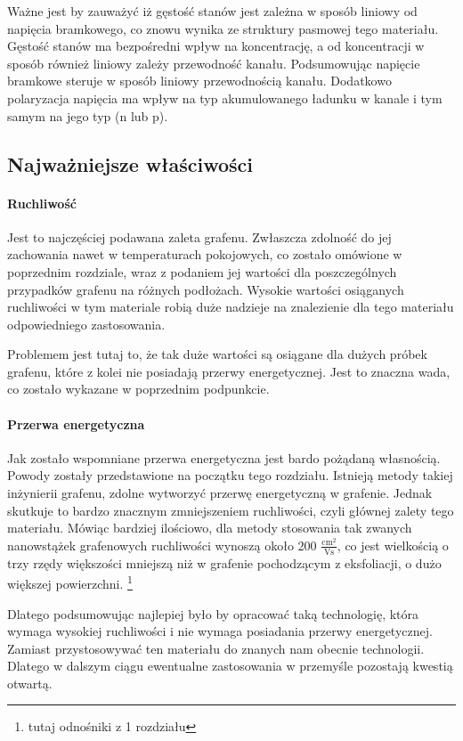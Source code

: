 	Ważne jest by zauważyć iż gęstość stanów jest zależna w sposób liniowy od napięcia bramkowego, co znowu wynika
	ze struktury pasmowej tego materiału. Gęstość stanów ma bezpośredni wpływ na koncentrację, a od koncentracji
	w sposób również liniowy zależy przewodność kanału. Podsumowując napięcie bramkowe steruje w sposób liniowy
	przewodnością kanału. Dodatkowo polaryzacja napięcia ma wpływ na typ akumulowanego ładunku w kanale i tym samym
	na jego typ (n lub p).
	

		\subsection{Najważniejsze właściwości}
			\paragraph{Ruchliwość}

	Jest to najczęściej podawana zaleta grafenu. Zwłaszcza zdolność do jej zachowania nawet w temperaturach 
	pokojowych, co zostało omówione w poprzednim rozdziale, wraz z podaniem jej wartości dla poszczególnych 
	przypadków grafenu na różnych podłożach.
	Wysokie wartości osiąganych ruchliwości w tym materiale robią duże nadzieje na znalezienie dla tego materiału
	odpowiedniego zastosowania. 
	
	Problemem jest tutaj to, że tak duże wartości są osiągane dla dużych próbek grafenu, które z kolei nie posiadają 
	przerwy energetycznej. Jest to znaczna wada, co zostało wykazane w poprzednim podpunkcie. 
			\paragraph{Przerwa energetyczna}


	Jak zostało wspomniane przerwa energetyczna jest bardo pożądaną własnością. Powody zostały przedstawione na początku
	tego rozdziału. Istnieją metody takiej inżynierii grafenu, zdolne wytworzyć przerwę energetyczną w grafenie. 
	Jednak skutkuje to bardzo znacznym zmniejszeniem ruchliwości, czyli głównej zalety tego materiału.
	Mówiąc bardziej ilościowo, dla metody stosowania tak zwanych nanowstążek grafenowych ruchliwości wynoszą około 
	200 $\mathrm{\frac{cm^2}{V s}}$, co jest wielkością o trzy rzędy większości mniejszą niż w grafenie pochodzącym
	z eksfoliacji, o dużo większej powierzchni. \footnote{tutaj odnośniki z 1 rozdziału}

Dlatego podsumowując najlepiej było by opracować taką technologię, która wymaga wysokiej ruchliwości i nie wymaga posiadania
przerwy energetycznej. Zamiast przystosowywać ten materiału do znanych nam obecnie technologii. Dlatego w dalszym ciągu
ewentualne zastosowania w przemyśle pozostają kwestią otwartą.

